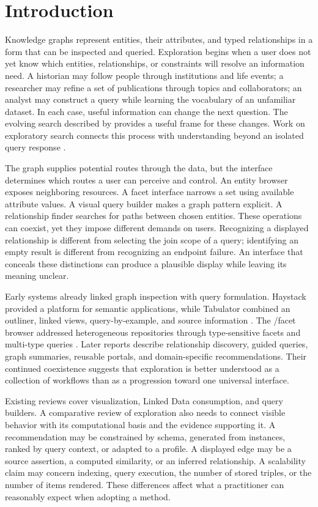 \documentclass[manuscript,review,screen]{acmart}
\begin{document}
\section{Introduction}
Knowledge graphs represent entities, their attributes, and typed relationships in a form that can be inspected and queried. Exploration begins when a user does not yet know which entities, relationships, or constraints will resolve an information need. A historian may follow people through institutions and life events; a researcher may refine a set of publications through topics and collaborators; an analyst may construct a query while learning the vocabulary of an unfamiliar dataset. In each case, useful information can change the next question. The evolving search described by \citet{bates1989} provides a useful frame for these changes. Work on exploratory search connects this process with understanding beyond an isolated query response \citep{marchionini2006,white2009}.

The graph supplies potential routes through the data, but the interface determines which routes a user can perceive and control. An entity browser exposes neighboring resources. A facet interface narrows a set using available attribute values. A visual query builder makes a graph pattern explicit. A relationship finder searches for paths between chosen entities. These operations can coexist, yet they impose different demands on users. Recognizing a displayed relationship is different from selecting the join scope of a query; identifying an empty result is different from recognizing an endpoint failure. An interface that conceals these distinctions can produce a plausible display while leaving its meaning unclear.

Early systems already linked graph inspection with query formulation. Haystack provided a platform for semantic applications, while Tabulator combined an outliner, linked views, query-by-example, and source information \citep{2003_Quan_Haystack_A,2006_Berners-Lee_Tabulator_Exploring}. The /facet browser addressed heterogeneous repositories through type-sensitive facets and multi-type queries \citep{2006_Hildebrand_facet_A}. Later reports describe relationship discovery, guided queries, graph summaries, reusable portals, and domain-specific recommendations. Their continued coexistence suggests that exploration is better understood as a collection of workflows than as a progression toward one universal interface.

Existing reviews cover visualization, Linked Data consumption, and query builders. A comparative review of exploration also needs to connect visible behavior with its computational basis and the evidence supporting it. A recommendation may be constrained by schema, generated from instances, ranked by query context, or adapted to a profile. A displayed edge may be a source assertion, a computed similarity, or an inferred relationship. A scalability claim may concern indexing, query execution, the number of stored triples, or the number of items rendered. These differences affect what a practitioner can reasonably expect when adopting a method.
\end{document}
